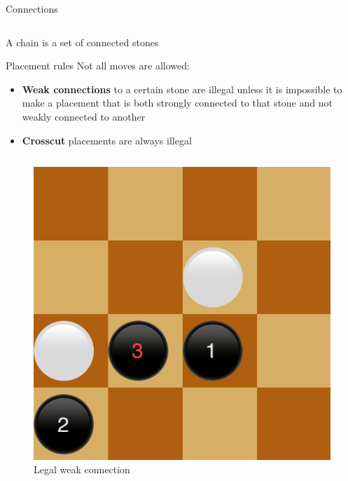 \documentclass{beamer}
\begin{document}
\begin{frame}{Connections}
\begin{columns}
	\end{columns}
	\vspace{0.7cm}
	A chain is a set of connected stones

      \end{frame}
      
      \begin{frame}{Placement rules}
     Not all moves are allowed:
     \begin{itemize}
     \item \textbf{Weak connections} to a certain stone are illegal unless it is impossible to make a placement that is both strongly connected to that stone and not weakly connected to another
     \item \textbf{Crosscut} placements are always illegal
     \end{itemize}
    \begin{columns}
			\begin{figure}
				\includegraphics[scale=0.35]{images/legal_weak.png}
				\caption*{Legal weak connection}
			\end{figure}
					

\end{columns}
\end{frame}
\end{document}
